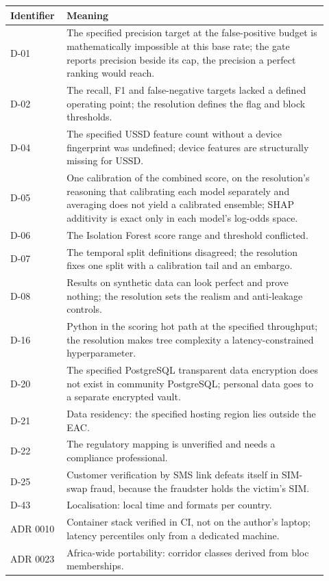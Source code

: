 \begin{longtable}{p{0.14\linewidth}p{0.78\linewidth}}
\toprule
Identifier & Meaning \\
\midrule
\endhead
D-01 & The specified precision target at the false-positive budget is mathematically impossible at this base rate; the gate reports precision beside its cap, the precision a perfect ranking would reach. \\
D-02 & The recall, F1 and false-negative targets lacked a defined operating point; the resolution defines the flag and block thresholds. \\
D-04 & The specified USSD feature count without a device fingerprint was undefined; device features are structurally missing for USSD. \\
D-05 & One calibration of the combined score, on the resolution's reasoning that calibrating each model separately and averaging does not yield a calibrated ensemble; SHAP additivity is exact only in each model's log-odds space. \\
D-06 & The Isolation Forest score range and threshold conflicted. \\
D-07 & The temporal split definitions disagreed; the resolution fixes one split with a calibration tail and an embargo. \\
D-08 & Results on synthetic data can look perfect and prove nothing; the resolution sets the realism and anti-leakage controls. \\
D-16 & Python in the scoring hot path at the specified throughput; the resolution makes tree complexity a latency-constrained hyperparameter. \\
D-20 & The specified PostgreSQL transparent data encryption does not exist in community PostgreSQL; personal data goes to a separate encrypted vault. \\
D-21 & Data residency: the specified hosting region lies outside the EAC. \\
D-22 & The regulatory mapping is unverified and needs a compliance professional. \\
D-25 & Customer verification by SMS link defeats itself in SIM-swap fraud, because the fraudster holds the victim's SIM. \\
D-43 & Localisation: local time and formats per country. \\
ADR 0010 & Container stack verified in CI, not on the author's laptop; latency percentiles only from a dedicated machine. \\
ADR 0023 & Africa-wide portability: corridor classes derived from bloc memberships. \\

\end{longtable}
